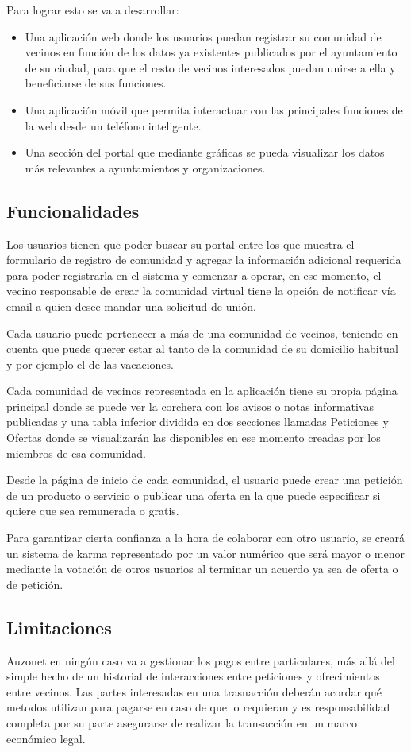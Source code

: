 \documentclass{DeustoFDP}
\begin{document}
Para lograr esto se va a desarrollar:
\begin{itemize}
  \item Una aplicación web donde los usuarios puedan registrar su comunidad de vecinos en función de los datos ya existentes publicados por el ayuntamiento de su ciudad, para que el resto de vecinos interesados puedan unirse a ella y beneficiarse de sus funciones.
  \item Una aplicación móvil que permita interactuar con las principales funciones de la web desde un teléfono inteligente.
  \item Una sección del portal que mediante gráficas se pueda visualizar los datos más relevantes a ayuntamientos y organizaciones.
\end{itemize}

\subsection{Funcionalidades}
Los usuarios tienen que poder buscar su portal entre los que muestra el formulario de registro de comunidad y agregar la información adicional requerida para poder registrarla en el sistema y comenzar a operar, en ese momento, el vecino responsable de crear la comunidad virtual tiene la opción de notificar vía email a quien desee mandar una solicitud de unión.

Cada usuario puede pertenecer a más de una comunidad de vecinos, teniendo en cuenta que puede querer estar al tanto de la comunidad de su domicilio habitual y por ejemplo el de las vacaciones.

Cada comunidad de vecinos representada en la aplicación tiene su propia página principal donde se puede ver la corchera con los avisos o notas informativas publicadas y una tabla inferior dividida en dos secciones llamadas Peticiones y Ofertas donde se visualizarán las disponibles en ese momento creadas por los miembros de esa comunidad.

Desde la página de inicio de cada comunidad, el usuario puede crear una petición de un producto o servicio o publicar una oferta en la que puede especificar si quiere que sea remunerada o gratis.

Para garantizar cierta confianza a la hora de colaborar con otro usuario, se creará un sistema de karma representado por un valor numérico que será mayor o menor mediante la votación de otros usuarios al terminar un acuerdo ya sea de oferta o de petición.

\subsection{Limitaciones}
Auzonet en ningún caso va a gestionar los pagos entre particulares, más allá del simple hecho de un historial de interacciones entre peticiones y ofrecimientos entre vecinos. Las partes interesadas en una trasnacción deberán acordar qué metodos utilizan para pagarse en caso de que lo requieran y es responsabilidad completa por su parte asegurarse de realizar la transacción en un marco económico legal.
\end{document}
